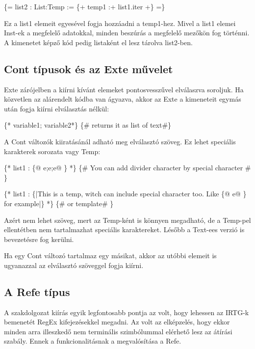 {\{= list2 : List:Temp := \{+ temp1 :+ list1.iter +\} =\}

Ez a list1 elemeit egyesével fogja hozzáadni a temp1-hez.
Mivel a list1 elemei Inst-ek a megfelelő adatokkal, minden beszúrás a megfelelő mezőkön fog történni.
A kimenetet képző kód pedig listaként el lesz tárolva list2-ben.

\subsection{Cont típusok és az Exte művelet}
\label{sec:SContExte}
Exte zárójelben a kiírni kívánt elemeket pontosvesszűvel elválaszva soroljuk.
Ha közvetlen az alárendelt kódba van ágyazva, akkor az Exte a kimeneteit egymás után fogja kiírni elválasztás nélkül:

\{* variable1; variable2*\} \{\# returns it as list of text\#\}

A Cont változók kiiratásánál adható meg elválasztó szöveg.
Ez lehet speciális karakterek sorozata vagy Temp:

\{* list1 : \{@ e;e;e@ \} *\} \{\# You can add divider character by special character \#  \}

\{* list1 : \{|This is a temp, witch can include special character too. Like \{@ e@ \} for example|\} *\} \{\# or template\# \}

Azért nem lehet szöveg, mert az Temp-ként is könnyen megadható, de a Temp-pel ellentétben nem tartalmazhat speciális karaktereket.
Lésőbb a Text-ees verzió is bevezetésre fog kerülni.

Ha egy Cont változó tartalmaz egy másikat, akkor az utóbbi elemeit is ugyanazzal az elválasztó szöveggel fogja kiírni. 

\subsection{A Refe típus}
\label{sec:SRefe}

A szakdolgozat kiírás egyik legfontosabb pontja az volt, hogy lehessen az IRTG-k bemenetét RegEx kifejezésekkel megadni.
Az volt az elképzelés, hogy ekkor minden arra illeszkedő nem terminális szimbólummal elérhető lesz az átírási szabály.
Ennek a funkcionalitásnak a megvalósítása a Refe.

}
